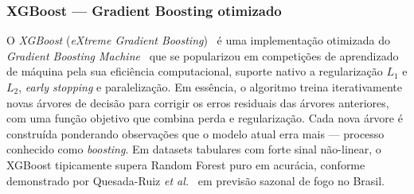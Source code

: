 %
%


\subsubsection{XGBoost --- Gradient Boosting otimizado}
\label{subsec:fund_xgboost}

O \emph{XGBoost} (\emph{eXtreme Gradient Boosting})~\cite{chen2016xgboost} é uma implementação otimizada do \emph{Gradient Boosting Machine}~\cite{friedman2001greedy} que se popularizou em competições de aprendizado de máquina pela sua eficiência computacional, suporte nativo a regularização \(L_1\) e \(L_2\), \emph{early stopping} e paralelização. Em essência, o algoritmo treina iterativamente novas árvores de decisão para corrigir os erros residuais das árvores anteriores, com uma função objetivo que combina perda e regularização. Cada nova árvore é construída ponderando observações que o modelo atual erra mais --- processo conhecido como \emph{boosting}. Em datasets tabulares com forte sinal não-linear, o XGBoost tipicamente supera Random Forest puro em acurácia, conforme demonstrado por Quesada-Ruiz \emph{et al.}~\cite{npjhazards2025fire} em previsão sazonal de fogo no Brasil.

